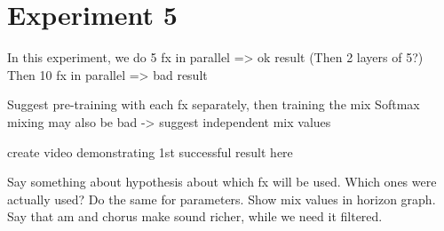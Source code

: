 \section{Experiment 5}
In this experiment, we do 5 fx in parallel => ok result
(Then 2 layers of 5?)
Then 10 fx in parallel => bad result

Suggest pre-training with each fx separately, then training the mix
Softmax mixing may also be bad -> suggest independent mix values

create video demonstrating 1st successful result here

Say something about hypothesis about which fx will be used. Which ones were actually used? Do the same for parameters. Show mix values in horizon graph. Say that am and chorus make sound richer, while we need it filtered.